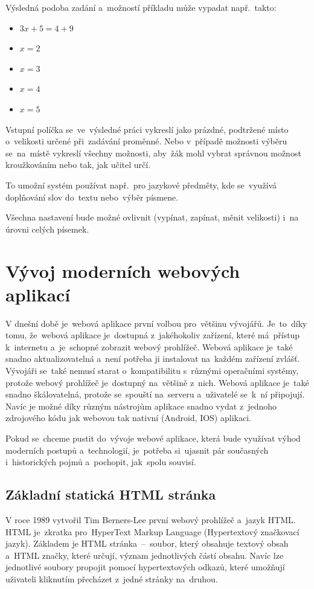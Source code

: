 \documentclass[14pt]{article}
\begin{document}
        Výsledná podoba zadání a~možností příkladu může vypadat např.~takto:
        \begin{itemize}
            \item $3x + 5 = 4 + 9$
            \item $x = 2$
            \item $x = 3$
            \item $x = 4$
            \item $x = 5$
        \end{itemize}

        Vstupní políčka se~ve~výsledné práci vykreslí jako prázdné, podtržené místo o~velikosti určené při~zadávání proměnné.
        Nebo v~případě možnosti výběru se~na~místě vykreslí všechny možnosti, aby~žák mohl vybrat správnou možnost kroužkováním nebo tak, jak učitel určí.
        
        To umožní systém používat např.~pro jazykové předměty, kde se~využívá doplňování slov do~textu nebo~výběr písmene.

        Všechna nastavení bude možné ovlivnit (vypínat, zapínat, měnit velikosti) i~na úrovni celých písemek.

    \section{Vývoj moderních webových aplikací}
    V dnešní době je~webová aplikace první volbou pro~většinu vývojářů. Je~to~díky tomu, že~webová aplikace je~dostupná z~jakéhokoliv zařízení,
    které má~přístup k~internetu a~je~schopné zobrazit webový prohlížeč. Webová aplikace je~také snadno aktualizovatelná a~není potřeba ji
    instalovat na~každém zařízení zvlášť. Vývojáři se~také nemusí starat o~kompatibilitu s~různými operačními systémy, protože webový prohlížeč
    je~dostupný na~většině z~nich. Webová aplikace je~také snadno škálovatelná, protože se~spouští na~serveru a~uživatelé se~k~ní připojují.
    Navíc je možné díky různým nástrojům aplikace snadno vydat z~jednoho zdrojového kódu jak webovou tak nativní (Android, IOS) aplikaci.\parencite{adobe:webapp}

    Pokud se~chceme pustit do~vývoje webové aplikace, která bude využívat výhod moderních postupů a~technologií, je~potřeba si~ujasnit pár současných i~historických pojmů a~pochopit, jak~spolu souvisí.

        \subsection{Základní statická HTML stránka}
        V roce 1989 vytvořil Tim Berners-Lee první webový prohlížeč a~jazyk HTML. HTML je~zkratka pro~HyperText Markup Language (Hypertextový značkovací jazyk).
        Základem je HTML stránka~--~soubor, který obsahuje textový obsah a~HTML značky, které určují, význam jednotlivých částí obsahu.
        Navíc lze jednotlivé soubory propojit pomocí hypertextových odkazů, které umožňují uživateli kliknutím přecházet z~jedné stránky na~druhou.
\end{document}

